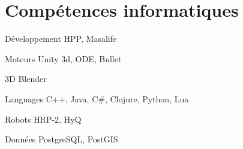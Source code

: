 \documentclass{tccv}
\begin{document}
\section{Comp\'{e}tences informatiques}

\begin{factlist}

\item{D\'eveloppement}
     {HPP, Masalife}

\item{Moteurs}
     {Unity 3d, ODE, Bullet}

\item{3D}
     {Blender}
	 
\item{Languages}
     {C++, Java, C\#, Clojure, Python, Lua}
	 
\item{Robots}
     {HRP-2, HyQ}
	 
\item{Donn\'{e}es}
     {PostgreSQL, PostGIS}


\end{factlist}








\end{document}

